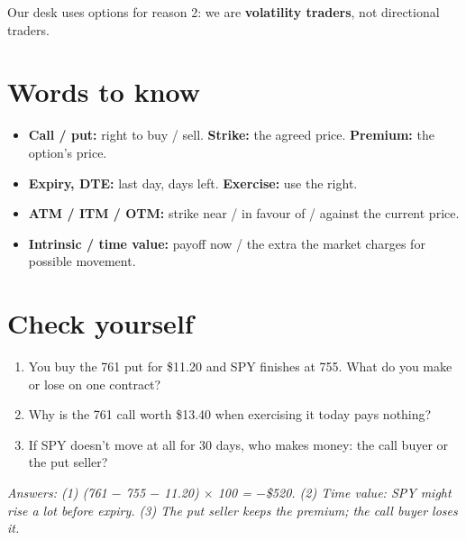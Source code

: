 \documentclass{article}
\begin{document}
Our desk uses options for reason 2: we are \textbf{volatility traders}, not directional traders.

\section{Words to know}

\begin{itemize}

\item \textbf{Call /\allowbreak{} put:} right to buy /\allowbreak{} sell. \textbf{Strike:} the agreed price. \textbf{Premium:} the option's price.

\item \textbf{Expiry, DTE:} last day, days left. \textbf{Exercise:} use the right.

\item \textbf{ATM /\allowbreak{} ITM /\allowbreak{} OTM:} strike near /\allowbreak{} in favour of /\allowbreak{} against the current price.

\item \textbf{Intrinsic /\allowbreak{} time value:} payoff now /\allowbreak{} the extra the market charges for possible movement.

\end{itemize}

\section{Check yourself}

\begin{enumerate}

\item You buy the 761 put for \$11.20 and SPY finishes at 755. What do you make or lose on one contract?

\item Why is the 761 call worth \$13.40 when exercising it today pays nothing?

\item If SPY doesn't move at all for 30 days, who makes money: the call buyer or the put seller?

\end{enumerate}

\emph{Answers: (1) (761 \ensuremath{-} 755 \ensuremath{-} 11.20) \ensuremath{\times} 100 = \ensuremath{-}\$520. (2) Time value: SPY might rise a lot before expiry. (3) The put seller keeps the premium; the call buyer loses it.}
\end{document}
